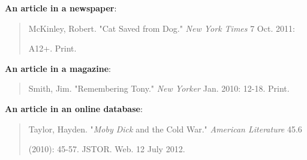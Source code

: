 \textbf{An article in a newspaper}:
\begin{quote}
McKinley, Robert. "Cat Saved from Dog." \emph{New York Times} 7 Oct. 2011:

\hspace{.4in}A12+. Print.
\end{quote}

\textbf{An article in a magazine}:
\begin{quote}
Smith, Jim. "Remembering Tony." \emph{New Yorker} Jan. 2010: 12-18. Print.
\end{quote}

\textbf{An article in an online database}:
\begin{quote}
Taylor, Hayden. "\emph{Moby Dick} and the Cold War." \emph{American Literature} 45.6 

\hspace{.4in}(2010): 45-57. JSTOR. Web. 12 July 2012.
\end{quote}

